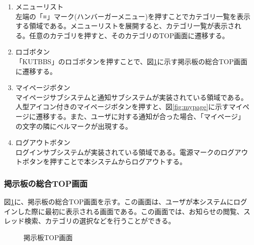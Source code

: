 \documentclass[a4j]{jarticle}
\begin{document}
\begin{enumerate}
  \renewcommand{\labelenumi}{\textcircled{\scriptsize \theenumi}}

  \item メニューリスト\\
  左端の「≡」マーク(ハンバーガーメニュー)を押すことでカテゴリ一覧を表示する領域である。メニューリストを展開すると、カテゴリ一覧が表示される。任意のカテゴリを押すと、そのカテゴリのTOP画面に遷移する。
  \item ロゴボタン\\
  「KUTBBS」のロゴボタンを押すことで、図\ref{fig:BBS_top}に示す掲示板の総合TOP画面に遷移する。
  \item マイページボタン\\
  マイページサブシステムと通知サブシステムが実装されている領域である。人型アイコン付きのマイページボタンを押すと、図\ref{fig:mypage}に示すマイページに遷移する。また、ユーザに対する通知が合った場合、「マイページ」の文字の隣にベルマークが出現する。
  \item ログアウトボタン\\
  ログインサブシステムが実装されている領域である。電源マークのログアウトボタンを押すことで本システムからログアウトする。
\end{enumerate}


\subsubsection{掲示板の総合TOP画面}
図\ref{fig:BBS_top}に、掲示板の総合TOP画面を示す。この画面は、ユーザが本システムにログインした際に最初に表示される画面である。この画面では、お知らせの閲覧、スレッド検索、カテゴリの選択などを行うことができる。

\begin{figure}[H]
\centering
{}
\caption{掲示板TOP画面}
\label{fig:BBS_top}
\end{figure}
\end{document}
